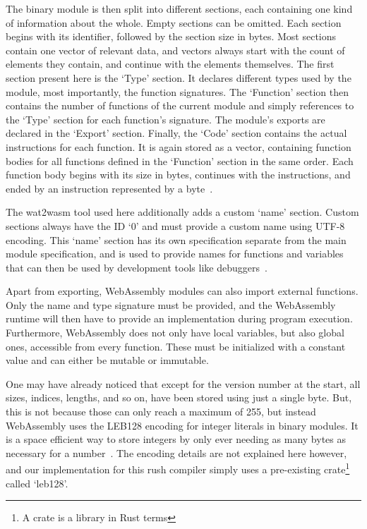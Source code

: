 The binary module is then split into different sections, each containing one kind of information about the whole.
Empty sections can be omitted.
Each section begins with its identifier, followed by the section size in bytes.
Most sections contain one vector of relevant data, and vectors always start with the count of elements they contain, and continue with the elements themselves.
The first section present here is the `Type' section.
It declares different types used by the module, most importantly, the function signatures.
The `Function' section then contains the number of functions of the current module and simply references to the `Type' section for each function's signature.
The module's exports are declared in the `Export' section.
Finally, the `Code' section contains the actual instructions for each function.
It is again stored as a vector, containing function bodies for all functions defined in the `Function' section in the same order.
Each function body begins with its size in bytes, continues with the instructions, and ended by an  instruction represented by a  byte~\cite[Sections~5.5,5.1.3,5.4.9]{WasmSpec}.

The wat2wasm tool used here additionally adds a custom `name' section.
Custom sections always have the ID `0' and must provide a custom name using UTF-8 encoding.
This `name' section has its own specification separate from the main module specification, and is used to provide names for functions and variables that can then be used by development tools like debuggers~\cite[Section~7.4.1]{WasmSpec}.

Apart from exporting, WebAssembly modules can also import external functions.
Only the name and type signature must be provided, and the WebAssembly runtime will then have to provide an implementation during program execution.
Furthermore, WebAssembly does not only have local variables, but also global ones, accessible from every function.
These must be initialized with a constant value and can either be mutable or immutable.

One may have already noticed that except for the version number at the start, all sizes, indices, lengths, and so on, have been stored using just a single byte.
But, this is not because those can only reach a maximum of 255, but instead WebAssembly uses the LEB128 encoding for integer literals in binary modules.
It is a space efficient way to store integers by only ever needing as many bytes as necessary for a number~\cite[Section~5.2.2]{WasmSpec}.
The encoding details are not explained here however, and our implementation for this rush compiler simply uses a pre-existing crate\footnote{A crate is a library in Rust terms} called `leb128'.


